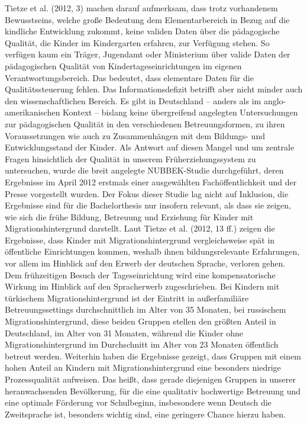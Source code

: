 Tietze et al. (2012, 3) machen darauf aufmerksam, dass trotz vorhandenem Bewusstseins, welche große Bedeutung dem Elementarbereich in Bezug auf die kindliche Entwicklung zukommt, keine validen Daten über die pädagogische Qualität, die Kinder im Kindergarten erfahren, zur Verfügung stehen.
So verfügen kaum ein Träger, Jugendamt oder Ministerium über valide Daten der pädagogischen Qualität von Kindertageseinrichtungen im eigenen Verantwortungsbereich. Das bedeutet, dass elementare Daten für die Qualitätssteuerung fehlen.
Das Informationsdefizit betrifft aber nicht minder auch den wissenschaftlichen Bereich. Es gibt in Deutschland – anders als im anglo-amerikanischen Kontext – bislang keine übergreifend angelegten Untersuchungen zur pädagogischen Qualität in den verschiedenen Betreuungsformen, zu ihren Voraussetzungen wie auch zu Zusammenhängen mit dem Bildungs- und Entwicklungsstand der Kinder. Als Antwort auf diesen Mangel und um zentrale Fragen
hinsichtlich der Qualität in unserem Früherziehungssystem zu
untersuchen, wurde die breit angelegte NUBBEK-Studie durchgeführt, deren Ergebnisse im April 2012 erstmals einer ausgewählten Fachöffentlichkeit und der Presse vorgestellt wurden. 
Der Fokus dieser Studie lag nicht auf Inklusion, die Ergebnisse sind für die Bachelorthesis nur insofern relevant, als dass sie zeigen, wie sich die frühe Bildung, Betreuung und Erziehung für Kinder mit Migrationshintergrund darstellt. 
Laut Tietze et al. (2012, 13 ff.) zeigen die Ergebnisse, dass Kinder mit Migrationshintergrund vergleichsweise spät in öffentliche Einrichtungen  kommen, weshalb ihnen bildungsrelevante Erfahrungen, vor allem im Hinblick auf den Erwerb der deutschen Sprache, verloren gehen. Dem frühzeitigen Besuch der Tageseinrichtung wird eine kompensatorische Wirkung im Hinblick auf den Spracherwerb zugeschrieben. Bei Kindern mit türkischem Migrationshintergrund ist der Eintritt in außerfamiliäre Betreuungssettings durchschnittlich im Alter von 35 Monaten, bei russischem Migrationshintergrund, diese beiden Gruppen stellen den größten Anteil in Deutschland, im Alter von 31 Monaten, während die Kinder ohne Migrationshintergrund im Durchschnitt im Alter von 23 Monaten öffentlich betreut werden. Weiterhin haben die Ergebnisse gezeigt, dass Gruppen mit einem hohen Anteil an Kindern mit Migrationshintergrund eine besonders niedrige Prozessqualität aufweisen. Das heißt, dass gerade diejenigen Gruppen in unserer heranwachsenden Bevölkerung, für die eine qualitativ hochwertige Betreuung und eine optimale Förderung vor Schulbeginn, insbesondere wenn Deutsch die Zweitsprache ist, besonders wichtig sind, eine geringere Chance hierzu haben.
